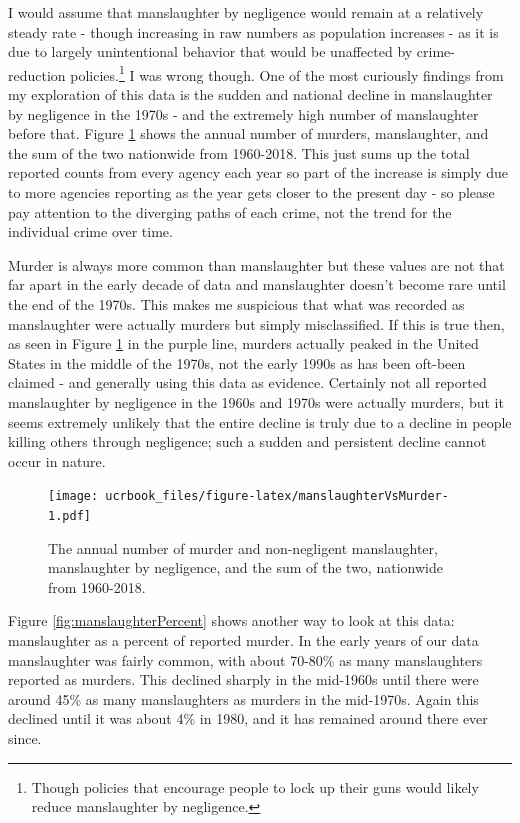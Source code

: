 \documentclass[
  12pt,
  openany]{book}
\begin{document}
I would assume that manslaughter by negligence would remain at a relatively steady rate - though increasing in raw numbers as population increases - as it is due to largely unintentional behavior that would be unaffected by crime-reduction policies.\footnote{Though policies that encourage people to lock up their guns would likely reduce manslaughter by negligence.} I was wrong though. One of the most curiously findings from my exploration of this data is the sudden and national decline in manslaughter by negligence in the 1970s - and the extremely high number of manslaughter before that. Figure \ref{fig:manslaughterVsMurder} shows the annual number of murders, manslaughter, and the sum of the two nationwide from 1960-2018. This just sums up the total reported counts from every agency each year so part of the increase is simply due to more agencies reporting as the year gets closer to the present day - so please pay attention to the diverging paths of each crime, not the trend for the individual crime over time.

Murder is always more common than manslaughter but these values are not that far apart in the early decade of data and manslaughter doesn't become rare until the end of the 1970s. This makes me suspicious that what was recorded as manslaughter were actually murders but simply misclassified. If this is true then, as seen in Figure \ref{fig:manslaughterVsMurder} in the purple line, murders actually peaked in the United States in the middle of the 1970s, not the early 1990s as has been oft-been claimed - and generally using this data as evidence. Certainly not all reported manslaughter by negligence in the 1960s and 1970s were actually murders, but it seems extremely unlikely that the entire decline is truly due to a decline in people killing others through negligence; such a sudden and persistent decline cannot occur in nature.

\begin{figure}
\centering
\texttt{[image: ucrbook\_files/figure-latex/manslaughterVsMurder-1.pdf]}
\caption{\label{fig:manslaughterVsMurder}The annual number of murder and non-negligent manslaughter, manslaughter by negligence, and the sum of the two, nationwide from 1960-2018.}
\end{figure}

Figure \ref{fig:manslaughterPercent} shows another way to look at this data: manslaughter as a percent of reported murder. In the early years of our data manslaughter was fairly common, with about 70-80\% as many manslaughters reported as murders. This declined sharply in the mid-1960s until there were around 45\% as many manslaughters as murders in the mid-1970s. Again this declined until it was about 4\% in 1980, and it has remained around there ever since.
\end{document}
